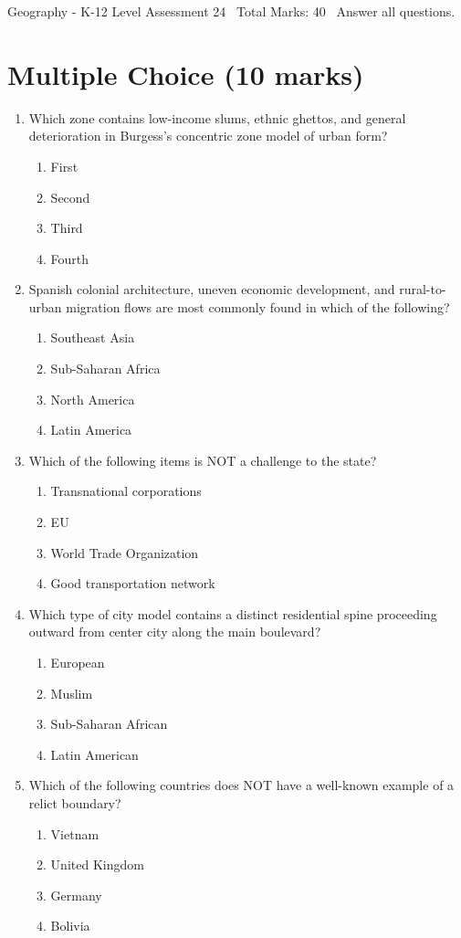\documentclass[12pt]{article}
\begin{document}
\begin{center}
Geography - K-12 Level Assessment 24 \
Total Marks: 40 \
Answer all questions.
\end{center}

\section*{Multiple Choice (10 marks)}
\begin{enumerate}[label=\arabic*.]
\item Which zone contains low-income slums, ethnic ghettos, and general deterioration in Burgess's concentric zone model of urban form?
\begin{enumerate}[label=(\alph*)]
    \item First
    \item Second
    \item Third
    \item Fourth
\end{enumerate}
\item Spanish colonial architecture, uneven economic development, and rural-to-urban migration flows are most commonly found in which of the following?
\begin{enumerate}[label=(\alph*)]
    \item Southeast Asia
    \item Sub-Saharan Africa
    \item North America
    \item Latin America
\end{enumerate}
\item Which of the following items is NOT a challenge to the state?
\begin{enumerate}[label=(\alph*)]
    \item Transnational corporations
    \item EU
    \item World Trade Organization
    \item Good transportation network
\end{enumerate}
\item Which type of city model contains a distinct residential spine proceeding outward from center city along the main boulevard?
\begin{enumerate}[label=(\alph*)]
    \item European
    \item Muslim
    \item Sub-Saharan African
    \item Latin American
\end{enumerate}
\item Which of the following countries does NOT have a well-known example of a relict boundary?
\begin{enumerate}[label=(\alph*)]
    \item Vietnam
    \item United Kingdom
    \item Germany
    \item Bolivia
\end{enumerate}
\end{enumerate}
\end{document}
